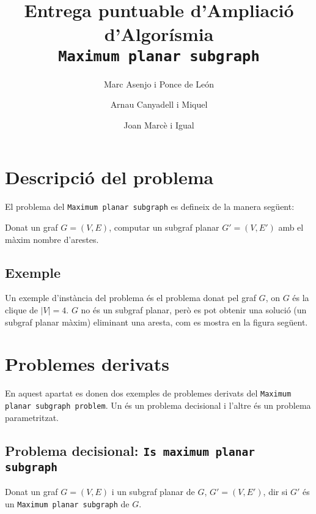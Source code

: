\documentclass[a4paper]{article}
\title{Entrega puntuable d'Ampliació d'Algorísmia \\ \texttt{Maximum planar subgraph}}
\author{Marc Asenjo i Ponce de León \and Arnau Canyadell i Miquel \and Joan Marcè i Igual}
\date{}
\begin{document}
\maketitle

\section{Descripció del problema}
El problema del \texttt{Maximum planar subgraph} es defineix de la manera següent:

Donat un graf $G=(V,E)$, computar un subgraf planar $G'=(V,E')$ amb el màxim nombre d'arestes.

\subsection{Exemple}
Un exemple d'instància del problema és el problema donat pel graf $G$, on $G$ és la clique de $|V|=4$. $G$ no és un subgraf planar, però es pot obtenir una solució (un subgraf planar màxim) eliminant una aresta, com es mostra en la figura següent.

\begin{figure}[!h]
	\centering
\end{figure}

\section{Problemes derivats}

En aquest apartat es donen dos exemples de problemes derivats del \texttt{Maximum planar subgraph problem}. Un és un problema decisional i l'altre és un problema parametritzat.

\subsection{Problema decisional: \texttt{Is maximum planar subgraph}}
Donat un graf $G=(V,E)$ i un subgraf planar de $G$, $G'=(V,E')$, dir si $G'$ és un \texttt{Maximum planar subgraph} de $G$.
\end{document}
